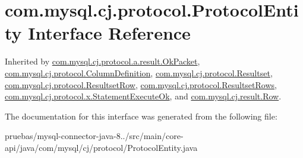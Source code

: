 \hypertarget{interfacecom_1_1mysql_1_1cj_1_1protocol_1_1_protocol_entity}{}\section{com.\+mysql.\+cj.\+protocol.\+Protocol\+Entity Interface Reference}
\label{interfacecom_1_1mysql_1_1cj_1_1protocol_1_1_protocol_entity}


Inherited by \mbox{\hyperlink{classcom_1_1mysql_1_1cj_1_1protocol_1_1a_1_1result_1_1_ok_packet}{com.\+mysql.\+cj.\+protocol.\+a.\+result.\+Ok\+Packet}}, \mbox{\hyperlink{interfacecom_1_1mysql_1_1cj_1_1protocol_1_1_column_definition}{com.\+mysql.\+cj.\+protocol.\+Column\+Definition}}, \mbox{\hyperlink{interfacecom_1_1mysql_1_1cj_1_1protocol_1_1_resultset}{com.\+mysql.\+cj.\+protocol.\+Resultset}}, \mbox{\hyperlink{interfacecom_1_1mysql_1_1cj_1_1protocol_1_1_resultset_row}{com.\+mysql.\+cj.\+protocol.\+Resultset\+Row}}, \mbox{\hyperlink{interfacecom_1_1mysql_1_1cj_1_1protocol_1_1_resultset_rows}{com.\+mysql.\+cj.\+protocol.\+Resultset\+Rows}}, \mbox{\hyperlink{classcom_1_1mysql_1_1cj_1_1protocol_1_1x_1_1_statement_execute_ok}{com.\+mysql.\+cj.\+protocol.\+x.\+Statement\+Execute\+Ok}}, and \mbox{\hyperlink{interfacecom_1_1mysql_1_1cj_1_1result_1_1_row}{com.\+mysql.\+cj.\+result.\+Row}}.



The documentation for this interface was generated from the following file\+:\begin{DoxyCompactItemize}
\item 
pruebas/mysql-\/connector-\/java-\/8../src/main/core-\/api/java/com/mysql/cj/protocol/Protocol\+Entity.\+java\end{DoxyCompactItemize}
